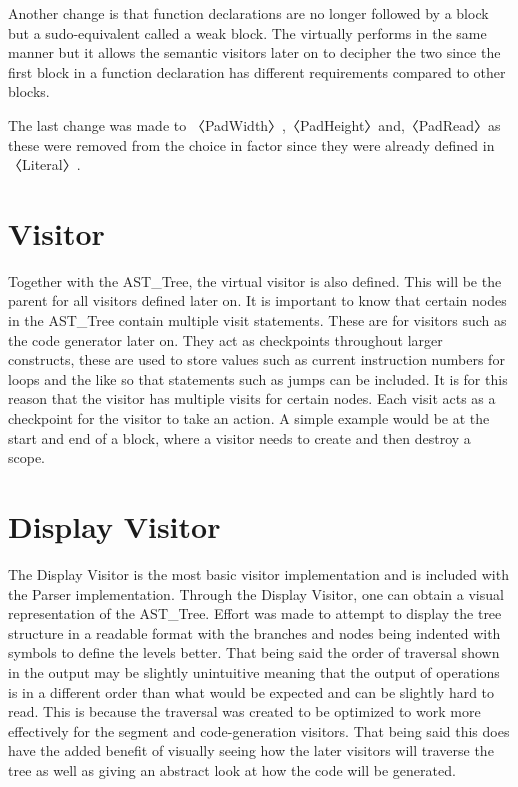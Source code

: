 \documentclass[12pt, a4paper]{report}
\begin{document}
Another change is that function declarations are no longer followed by a block but a sudo-equivalent called a weak block. The virtually performs in the same manner but it allows the semantic visitors later on to decipher the two since the first block in a function declaration has different requirements compared to other blocks.

The last change was made to 〈PadWidth〉,〈PadHeight〉and,〈PadRead〉as these were removed from the choice in factor since they were already defined in 〈Literal〉.

\section{Visitor}
Together with the AST\_Tree, the virtual visitor is also defined. This will be the parent for all visitors defined later on. It is important to know that certain nodes in the AST\_Tree contain multiple visit statements. These are for visitors such as the code generator later on. They act as checkpoints throughout larger constructs, these are used to store values such as current instruction numbers for loops and the like so that statements such as jumps can be included. It is for this reason that the visitor has multiple visits for certain nodes. Each visit acts as a checkpoint for the visitor to take an action. A simple example would be at the start and end of a block, where a visitor needs to create and then destroy a scope.

\section{Display Visitor}
The Display Visitor is the most basic visitor implementation and is included with the Parser implementation. Through the Display Visitor, one can obtain a visual representation of the AST\_Tree. Effort was made to attempt to display the tree structure in a readable format with the branches and nodes being indented with symbols to define the levels better. That being said the order of traversal shown in the output may be slightly unintuitive meaning that the output of operations is in a different order than what would be expected and can be slightly hard to read. This is because the traversal was created to be optimized to work more effectively for the segment and code-generation visitors. That being said this does have the added benefit of visually seeing how the later visitors will traverse the tree as well as giving an abstract look at how the code will be generated.
\end{document}
